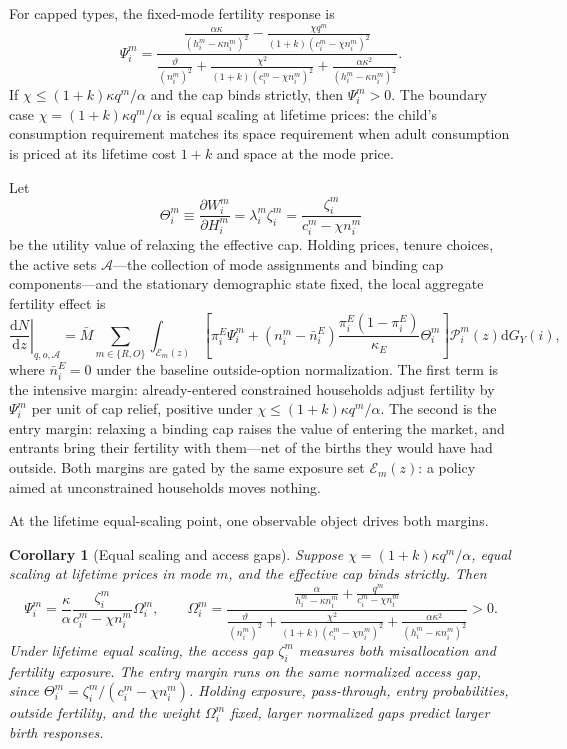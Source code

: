 \documentclass[11pt]{article}
\newtheorem{corollary}{Corollary}
\newcommand{\dd}{\mathrm d}
\newcommand{\1}{\mathbf 1}
\begin{document}
For capped types, the fixed-mode fertility response is
\[
\Psi_i^m
=
\frac{
\frac{\alpha\kappa}{(h_i^m-\kappa n_i^m)^2}
-
\frac{\chi q^m}{(1+k)(c_i^m-\chi n_i^m)^2}
}{
\frac{\vartheta}{(n_i^m)^2}
+
\frac{\chi^2}{(1+k)(c_i^m-\chi n_i^m)^2}
+
\frac{\alpha\kappa^2}{(h_i^m-\kappa n_i^m)^2}
}.
\]
If $\chi\le (1+k)\kappa q^m/\alpha$ and the cap binds strictly, then $\Psi_i^m>0$. The boundary case $\chi=(1+k)\kappa q^m/\alpha$ is equal scaling at lifetime prices: the child's consumption requirement matches its space requirement when adult consumption is priced at its lifetime cost $1+k$ and space at the mode price.

Let
\[
\Theta_i^m
\equiv
\frac{\partial W_i^m}{\partial H_i^m}
=
\lambda_i^m\zeta_i^m
=
\frac{\zeta_i^m}{c_i^m-\chi n_i^m}
\]
be the utility value of relaxing the effective cap. Holding prices, tenure choices, the active sets $\mathcal A$---the collection of mode assignments and binding cap components---and the stationary demographic state fixed, the local aggregate fertility effect is
\[
\left.\frac{\dd N}{\dd z}\right|_{q,o,\mathcal A}
=
\bar M
\sum_{m\in\{R,O\}}
\int_{\mathcal E_m(z)}
\left[
\pi_i^E\Psi_i^m
+
(n_i^m-\bar n_i^E)
\frac{\pi_i^E(1-\pi_i^E)}{\kappa_E}
\Theta_i^m
\right]
\mathcal P_i^m(z)
\dd G_Y(i),
\]
where $\bar n_i^E=0$ under the baseline outside-option normalization. The first term is the intensive margin: already-entered constrained households adjust fertility by $\Psi_i^m$ per unit of cap relief, positive under $\chi\le(1+k)\kappa q^m/\alpha$. The second is the entry margin: relaxing a binding cap raises the value of entering the market, and entrants bring their fertility with them---net of the births they would have had outside. Both margins are gated by the same exposure set $\mathcal E_m(z)$: a policy aimed at unconstrained households moves nothing.

At the lifetime equal-scaling point, one observable object drives both margins.

\begin{corollary}[Equal scaling and access gaps]
Suppose $\chi=(1+k)\kappa q^m/\alpha$, equal scaling at lifetime prices in mode $m$, and the effective cap binds strictly. Then
\[
\Psi_i^m
=
\frac{\kappa}{\alpha}
\frac{\zeta_i^m}{c_i^m-\chi n_i^m}
\Omega_i^m,
\qquad
\Omega_i^m
=
\frac{
\frac{\alpha}{h_i^m-\kappa n_i^m}+\frac{q^m}{c_i^m-\chi n_i^m}
}{
\frac{\vartheta}{(n_i^m)^2}
+
\frac{\chi^2}{(1+k)(c_i^m-\chi n_i^m)^2}
+
\frac{\alpha\kappa^2}{(h_i^m-\kappa n_i^m)^2}
}
>0.
\]
Under lifetime equal scaling, the access gap $\zeta_i^m$ measures both misallocation and fertility exposure. The entry margin runs on the same normalized access gap, since $\Theta_i^m=\zeta_i^m/(c_i^m-\chi n_i^m)$. Holding exposure, pass-through, entry probabilities, outside fertility, and the weight $\Omega_i^m$ fixed, larger normalized gaps predict larger birth responses.
\end{corollary}
\end{document}
